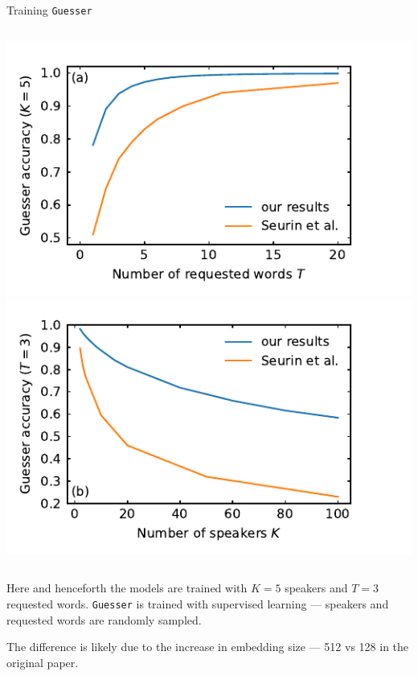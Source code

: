 \documentclass[11pt, aspectratio=169]{beamer}
\newcommand{\guesser}{\texttt{Guesser}}
\newcommand{\vimgscale}{0.8}
\begin{document}
\begin{frame}[t]{Training \guesser{}}
    \begin{columns}
        \centering
        \includegraphics[scale=\vimgscale]{../plots/word_sweep.pdf}
        \includegraphics[scale=\vimgscale]{../plots/guest_sweep.pdf}
    \end{columns}

    Here and henceforth the models are trained with $K = 5$ speakers and
    $T = 3$ requested words. \guesser{} is trained with supervised learning ---
    speakers and requested words are randomly sampled.

    The difference is likely due to the increase in embedding size --- 512 vs
    128 in the original paper.
\end{frame}
\end{document}

